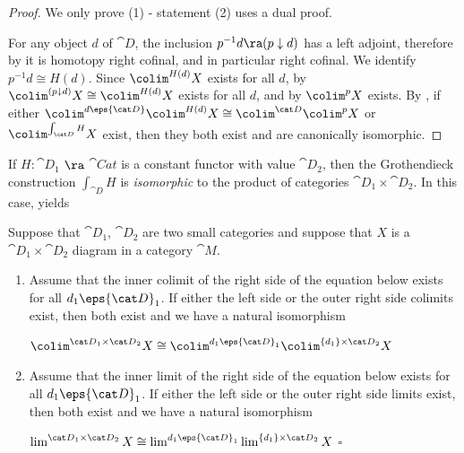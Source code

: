 \begin{proof}
We only prove (1) - statement (2) uses a dual proof.

For any object $d$ of ${\cat D}$, the inclusion $p^{-1}d \ra (p \downarrow d)$ has a left adjoint, therefore by  it is homotopy right cofinal, and in particular right cofinal. We identify $p^{-1}d \cong H(d)$. Since $\colim^{H(d)}X$ exists for all $d$, by  $\colim^{(p \downarrow d)}X \cong \colim^{H(d)}X$ exists for all $d$, and by  $\colim^p X$ exists. By , if either $\colim^{d \eps {\cat D}} \colim^{H(d)} X \cong \colim^{\cat D}\colim^p X$ or $\colim^{\int_{\cat D} H}X$ exist, then they both exist and are canonically isomorphic.
\end{proof}

If $H \colon {\cat D}_1$ $\ra$ ${\cat Cat}$ is a constant functor with value ${\cat D}_2$, then the Grothendieck construction $\int_{\cat D} H$ is {\it isomorphic} to the product of categories ${\cat D}_1 \times {\cat D}_2$. In this case,  yields


\begin{cor}
\label{cor:grothendieckconstrcolims}
Suppose that ${\cat D}_1$, ${\cat D}_2$ are two small categories and suppose that $X$ is a ${\cat D}_1 \times {\cat D}_2$ diagram in a category ${\cat M}$.
\begin{enumerate}
\item
Assume that the inner colimit of the right side of the equation below exists for all $d_1 \eps {\cat D}_1$. If either the left side or the outer right side colimits exist, then both exist and we have a natural isomorphism
\begin{center}
$\colim^{{\cat D}_1 \times {\cat D}_2}X \cong \colim^{d_1 \eps {\cat D}_1} \colim^{\{d_1\} \times {\cat D}_2} X$
\end{center}
\item
Assume that the inner limit of the right side of the equation below exists for all $d_1 \eps {\cat D}_1$. If either the left side or the outer right side limits exist, then both exist and we have a natural isomorphism
\begin{center}
$\lim^{{\cat D}_1 \times {\cat D}_2}X \cong \lim^{d_1 \eps {\cat D}_1} \lim^{\{d_1\} \times {\cat D}_2} X$ $\square$
\end{center}
\end{enumerate}
\end{cor}

